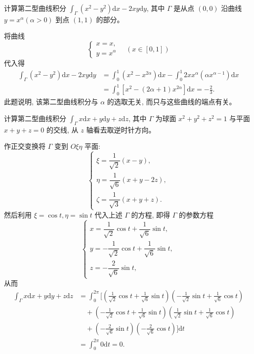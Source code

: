 \documentclass[12pt,fontset=fandol]{ctexart}
\begin{document}
\begin{example}\label{course-example-16-2-2}\quad 计算第二型曲线积分 $\int_\Gamma (x^2-y^2)\mathrm dx-2xy\mathrm dy$, 其中 $\Gamma$ 是从点 $(0,0)$ 沿曲线 $y=x^\alpha(\alpha>0)$ 到点 $(1,1)$ 的部分。

\end{example}
\begin{solve}\quad 将曲线
\[
  \begin{cases}
    x=x,\\
    y=x^\alpha
  \end{cases}
  \quad(x\in[0,1])
\]
代入得
\[
\begin{aligned}
  \int_\Gamma (x^2-y^2)\mathrm dx-2xy\mathrm dy
  &=\int_0^1(x^2-x^{2\alpha})\mathrm dx
    -\int_0^1 2xx^\alpha(\alpha x^{\alpha-1})\mathrm dx\\
  &=\int_0^1[x^2-(2\alpha+1)x^{2\alpha}]\mathrm dx
    =-\frac23.
\end{aligned}
\]
此题说明, 该第二型曲线积分与 $\alpha$ 的选取无关, 而只与这些曲线的端点有关。

\end{solve}
\begin{example}\label{course-example-16-2-3}\quad 计算第二型曲线积分 $\int_\Gamma x\mathrm dx+y\mathrm dy+z\mathrm dz$, 其中 $\Gamma$ 为球面 $x^2+y^2+z^2=1$ 与平面 $x+y+z=0$ 的交线, 从 $z$ 轴看去取逆时针方向。

\end{example}
\noindent{}\quad 作正交变换将 $\Gamma$ 变到 $O\xi\eta$ 平面:
\[
  \begin{cases}
    \xi=\dfrac1{\sqrt2}(x-y),\\
    \eta=\dfrac1{\sqrt6}(x+y-2z),\\
    \zeta=\dfrac1{\sqrt3}(x+y+z).
  \end{cases}
\]
然后利用 $\xi=\cos t,\eta=\sin t$ 代入上述 $\Gamma$ 的方程, 即得 $\Gamma$ 的参数方程
\[
  \begin{cases}
    x=\dfrac1{\sqrt2}\cos t+\dfrac1{\sqrt6}\sin t,\\
    y=-\dfrac1{\sqrt2}\cos t+\dfrac1{\sqrt6}\sin t,\\
    z=-\dfrac2{\sqrt6}\sin t,
  \end{cases}
\]
从而
\[
\begin{aligned}
  \int_\Gamma x\mathrm dx+y\mathrm dy+z\mathrm dz
  &=\int_0^{2\pi}\bigg[
    \left(\frac1{\sqrt2}\cos t+\frac1{\sqrt6}\sin t\right)
    \left(-\frac1{\sqrt2}\sin t+\frac1{\sqrt6}\cos t\right)\\
  &\quad+
    \left(-\frac1{\sqrt2}\cos t+\frac1{\sqrt6}\sin t\right)
    \left(\frac1{\sqrt2}\sin t+\frac1{\sqrt6}\cos t\right)\\
  &\quad+
    \left(-\frac2{\sqrt6}\sin t\right)
    \left(-\frac2{\sqrt6}\cos t\right)
  \bigg]\mathrm dt\\
  &=\int_0^{2\pi}0\mathrm dt=0.
\end{aligned}
\]
\end{document}
